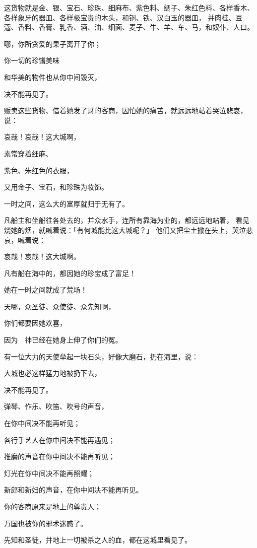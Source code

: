 {这货物就是金、银、宝石、珍珠、细麻布、紫色料、绸子、朱红色料、各样香木、各样象牙的器皿、各样极宝贵的木头，和铜、铁、汉白玉的器皿，
并肉桂、豆蔻、香料、香膏、乳香、酒、油、细面、麦子、牛、羊、车、马，和奴仆、人口。
\par }{\Q {}哪，你所贪爱的果子离开了你；
\par }{\Q 你一切的珍馐美味
\par }{\Q 和华美的物件也从你中间毁灭，
\par }{\Q 决不能再见了。
\par }{\PP {}贩卖这些货物、借着她发了财的客商，因怕她的痛苦，就远远地站着哭泣悲哀，说：
\par }{\Q {}哀哉！哀哉！这大城啊，
\par }{\Q 素常穿着细麻、
\par }{\Q 紫色、朱红色的衣服，
\par }{\Q 又用金子、宝石，和珍珠为妆饰。
\par }{\Q {}一时之间，这么大的富厚就归于无有了。
\par }{\PP 凡船主和坐船往各处去的，并众水手，连所有靠海为业的，都远远地站着，
看见烧她的烟，就喊着说：「有何城能比这大城呢？」
他们又把尘土撒在头上，哭泣悲哀，喊着说：
\par }{\Q 哀哉！哀哉！这大城啊。
\par }{\Q 凡有船在海中的，都因她的珍宝成了富足！
\par }{\Q 她在一时之间就成了荒场！
\par }{\Q {}天哪，众圣徒、众使徒、众先知啊，
\par }{\Q 你们都要因她欢喜，
\par }{\Q 因为　神已经在她身上伸了你们的冤。
\par }{\PP {}有一位大力的天使举起一块石头，好像大磨石，扔在海里，说：
\par }{大城也必这样猛力地被扔下去，
\par }{\Q 决不能再见了。
\par }{\Q {}弹琴、作乐、吹笛、吹号的声音，
\par }{\Q 在你中间决不能再听见；
\par }{\Q 各行手艺人在你中间决不能再遇见；
\par }{\Q 推磨的声音在你中间决不能再听见；
\par }{\Q {}灯光在你中间决不能再照耀；
\par }{\Q 新郎和新妇的声音，在你中间决不能再听见。
\par }{\Q 你的客商原来是地上的尊贵人；
\par }{\Q 万国也被你的邪术迷惑了。
\par }{\PP {}先知和圣徒，并地上一切被杀之人的血，都在这城里看见了。

}

